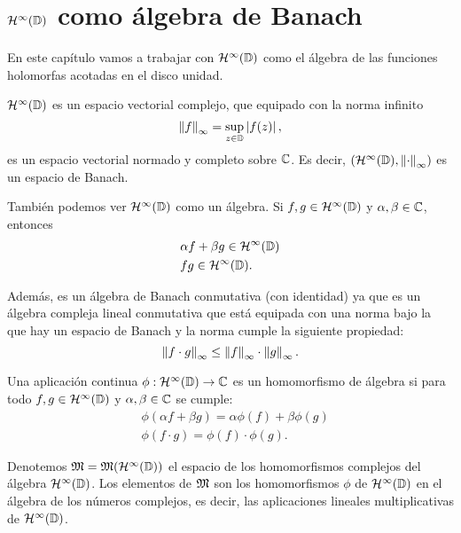 \chapter{$\mathcal{H}^{\infty}(\mathbb{D})$ como álgebra de Banach}

En este capítulo vamos a trabajar con $\mathcal{H}^{\infty}(\mathbb{D})$ como el álgebra de las funciones holomorfas acotadas en el disco unidad.

$\mathcal{H}^{\infty}(\mathbb{D})$ es un espacio vectorial complejo, que equipado con la norma infinito
\begin{equation*}
    \left\lVert f\right\rVert_{\infty} = \sup_{z \in \mathbb{D}} \left\lvert f(z)\right\rvert,
\end{equation*}
es un espacio vectorial normado y completo sobre $\mathbb{C}$. Es decir, $(\mathcal{H}^{\infty}(\mathbb{D}), \left\lVert\cdot\right\rVert_{\infty})$ es un espacio de Banach. 

También podemos ver $\mathcal{H}^{\infty}(\mathbb{D})$ como un álgebra. Si $f, g \in \mathcal{H}^{\infty}(\mathbb{D})$ y $\alpha, \beta \in \mathbb{C}$, entonces
\begin{equation*}
    \begin{split}
        & \alpha f + \beta g \in \mathcal{H}^{\infty}(\mathbb{D}) \\
        & fg \in \mathcal{H}^{\infty}(\mathbb{D}).
    \end{split}
\end{equation*}

Además, es un álgebra de Banach conmutativa (con identidad) ya que es un álgebra compleja lineal conmutativa que está equipada con una norma bajo la que hay un espacio de Banach y la norma cumple la siguiente propiedad:
\begin{equation*}
    \left\lVert f \cdot g\right\rVert_{\infty} \leq \left\lVert f\right\rVert_{\infty} \cdot \left\lVert g\right\rVert_{\infty}.
\end{equation*}

Una aplicación continua $\phi : \mathcal{H}^{\infty}(\mathbb{D}) \rightarrow \mathbb{C}$ es un homomorfismo de álgebra si para todo $f, g \in \mathcal{H}^{\infty}(\mathbb{D})$ y $\alpha, \beta \in \mathbb{C}$ se cumple:
\begin{equation}
    \begin{split}
        & \phi (\alpha f + \beta g) = \alpha \phi(f) + \beta \phi(g) \\
        & \phi(f \cdot g) = \phi(f) \cdot \phi(g).
    \end{split}
\end{equation}


Denotemos $\mathfrak{M} = \mathfrak{M} (\mathcal{H}^{\infty}(\mathbb{D}))$ el espacio de los homomorfismos complejos del álgebra $\mathcal{H}^{\infty}(\mathbb{D})$. Los elementos de $\mathfrak{M}$ son los homomorfismos $\phi$ de $\mathcal{H}^{\infty}(\mathbb{D})$ en el álgebra de los números complejos, es decir, las aplicaciones lineales multiplicativas de $\mathcal{H}^{\infty}(\mathbb{D})$. \\


